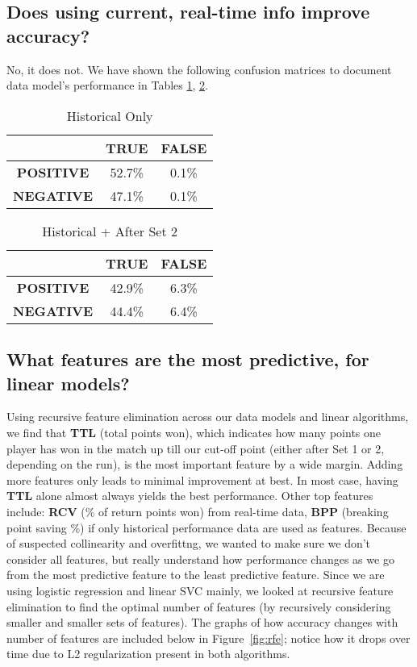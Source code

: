 \documentclass[paper=a4, fontsize=10pt]{scrartcl} %
\numberwithin{equation}{section} %
\numberwithin{figure}{section} %
\numberwithin{table}{section} %
\begin{document}
\subsection{Does using current, real-time info improve accuracy?}
No, it does not. We have shown the following confusion matrices to document data model's performance in Tables \ref{tab:h1}, \ref{tab:h4}. 
\begin{table}[h]
\caption{Historical Only}
\label{tab:h1}
\begin{tabular}{ c | c | c}
    \hline
    & \textbf{TRUE} & \textbf{FALSE}  \\ \hline
   \textbf{POSITIVE} &  52.7\% & 0.1\%  \\ \hline
   \textbf{NEGATIVE} & 47.1\% & 0.1\%  \\ \hline
\end{tabular}
\end{table}

\begin{table}[h]
\caption{Historical + After Set 2}
\label{tab:h4}
\begin{tabular}{ c | c | c}
    \hline
    & \textbf{TRUE} & \textbf{FALSE}  \\ \hline
   \textbf{POSITIVE} &  42.9\% & 6.3\%  \\ \hline
   \textbf{NEGATIVE} &44.4\% & 6.4\%  \\ \hline
\end{tabular}
\end{table}

\subsection{What features are the most predictive, for linear models?}
Using recursive feature elimination across our data models and linear algorithms, we find that \textbf{TTL} (total points won), which indicates how many points one player has won in the match up till our cut-off point (either after Set 1 or 2, depending on the run), is the most important feature by a wide margin. Adding more features only leads to minimal improvement at best. In most case, having \textbf{TTL} alone almost always yields the best performance. Other top features include: \textbf{RCV} (\% of return points won) from real-time data, \textbf{BPP} (breaking point saving \%) if only historical performance data are used as features. 
Because of suspected collinearity and overfittng, we wanted to make sure we don't consider all features, but really understand how performance changes as we go from the most predictive feature to the least predictive feature. Since we are using logistic regression and linear SVC mainly, we looked at recursive feature elimination to find the optimal number of features (by recursively considering smaller and smaller sets of features). The graphs of how accuracy changes with number of features are included below in Figure~\ref{fig:rfe}; notice how it drops over time due to L2 regularization present in both algorithms. 
\end{document}
